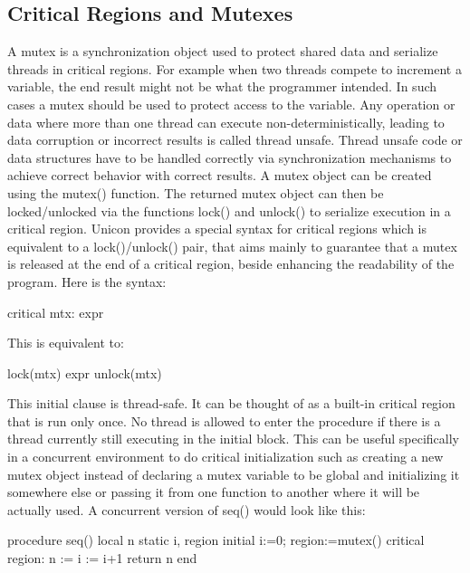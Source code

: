 \subsection{Critical Regions and Mutexes}
A mutex is a synchronization object used to protect shared data and serialize threads
in critical regions. For example when two threads compete to increment a variable,
the end result might not be what the programmer intended. In such cases a mutex should
be used to protect access to the variable. Any operation or data where more than one
thread can execute non-deterministically, leading to data corruption or incorrect results
is called thread unsafe. Thread unsafe code or data structures have to be handled correctly
via synchronization mechanisms to achieve correct behavior with correct results.
A mutex object can be created using the mutex() function. The returned mutex object can
then be locked/unlocked via the functions lock() and unlock() to serialize execution in
a critical region. Unicon provides a special syntax for critical regions which is equivalent
to a lock()/unlock() pair, that aims mainly to guarantee that a mutex is released at the
end of a critical region, beside enhancing the readability of the program. Here is the syntax:

\begin{iconcode}
critical mtx: expr
\end{iconcode}

This is equivalent to:

\begin{iconcode}
lock(mtx)
expr
unlock(mtx)
\end{iconcode}

This initial clause is thread-safe. It can be thought of as a built-in critical region that
is run only once. No thread is allowed to enter the procedure if there is a thread currently
still executing in the initial block. This can be useful specifically in a concurrent
environment to do critical initialization such as creating a new mutex object instead of
declaring a mutex variable to be global and initializing it somewhere else or passing it from
one function to another where it will be actually used. A concurrent version of seq() would
look like this:

\begin{iconcode}
procedure seq()
   local n
   static i, region
   initial {i:=0; region:=mutex()}
   critical region: n := i := i+1
   return n
end 
\end{iconcode}

